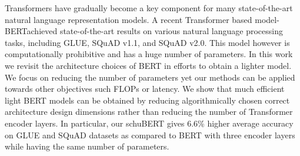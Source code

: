 Transformers have gradually become a key component for many state-of-the-art natural language representation models. A recent Transformer based model- BERTachieved state-of-the-art results on various natural language processing tasks, including GLUE, SQuAD v1.1, and SQuAD v2.0. This model however is computationally prohibitive and has a huge number of parameters. In this work we revisit the architecture choices of BERT in efforts to obtain a lighter model. We focus on reducing the number of parameters yet our methods can be applied towards other objectives such FLOPs or latency. We show that much efficient light BERT models can be obtained by reducing algorithmically chosen correct architecture design dimensions rather than reducing the number of Transformer encoder layers. In particular, our schuBERT gives 6.6\% higher average accuracy on GLUE and SQuAD datasets as compared to BERT with three encoder layers while having the same number of parameters.
